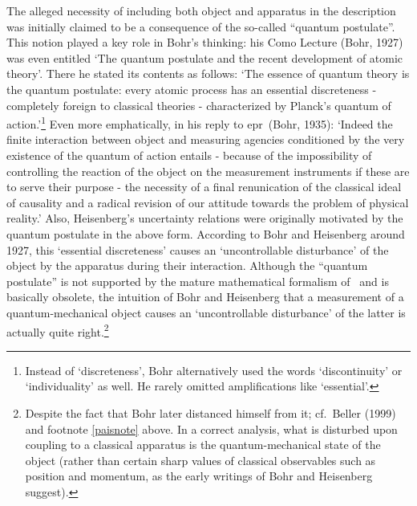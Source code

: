 \documentclass[12pt]{article}
\newcommand{\epr}{{\sc epr}}
\begin{document}
The alleged necessity of including both object and apparatus in the description was initially claimed to be a consequence of the so-called ``quantum postulate''. This notion played a key role in Bohr's thinking: his  Como Lecture (Bohr, 1927) was even entitled `The quantum postulate and the recent development of atomic theory'.  There he stated
its contents as follows:  `The essence of quantum theory is the quantum postulate: every atomic process has an essential discreteness -  completely foreign to classical theories - characterized by Planck's quantum of action.'\footnote{Instead of `discreteness', Bohr alternatively used the words  `discontinuity' or `individuality' as well. He rarely omitted amplifications like `essential'.} Even more emphatically, in his reply to \epr\ (Bohr, 1935):
`Indeed the finite interaction between object and measuring agencies conditioned by the very existence of the  quantum of action entails - because of the impossibility of controlling the reaction of the object on the measurement instruments if these are to serve their purpose - the necessity of a final renunication of the classical ideal of causality and a radical revision of our attitude towards the problem of physical reality.'
  Also, Heisenberg's uncertainty relations were originally motivated by the quantum postulate in the above form.
According to Bohr and Heisenberg around 1927, this `essential discreteness' causes an 
`uncontrollable disturbance' of the object by the apparatus during their interaction.
Although the ``quantum postulate'' is not supported by the mature mathematical formalism of \qm\ and is basically obsolete, the intuition of Bohr and Heisenberg that a measurement of a quantum-mechanical object causes an `uncontrollable disturbance' of the latter is actually quite right.\footnote{Despite the fact that  Bohr later distanced himself from it; cf.\ Beller (1999) and footnote  \ref{paisnote} above. In a correct analysis, what is disturbed upon coupling to a classical apparatus is the quantum-mechanical state of the object (rather than certain sharp values of  classical observables such as position and momentum, as the early writings of Bohr and Heisenberg suggest). } 
\end{document}
